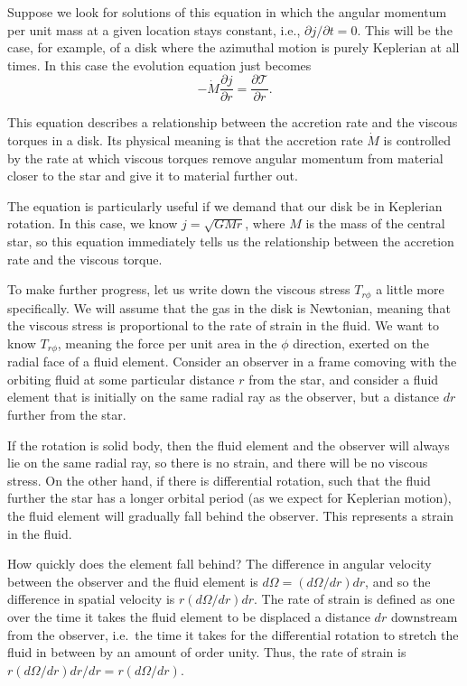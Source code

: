 Suppose we look for solutions of this equation in which the angular momentum per unit mass at a given location stays constant, i.e., $\partial j/\partial t=0$. This will be the case, for example, of a disk where the azimuthal motion is purely Keplerian at all times. In this case the evolution equation just becomes
\begin{equation}
-\dot{M} \frac{\partial j}{\partial r} = \frac{\partial \mathcal{T}}{\partial r}.
\end{equation}

This equation describes a relationship between the accretion rate and the viscous torques in a disk. Its physical meaning is that the accretion rate $\dot{M}$ is controlled by the rate at which viscous torques remove angular momentum from material closer to the star and give it to material further out.

The equation is particularly useful if we demand that our disk be in Keplerian rotation. In this case, we know $j=\sqrt{G M r}$, where $M$ is the mass of the central star, so this equation immediately tells us the relationship between the accretion rate and the viscous torque.

To make further progress, let us write down the viscous stress $T_{r\phi}$ a little more specifically. We will assume that the gas in the disk is Newtonian, meaning that the viscous stress is proportional to the rate of strain in the fluid. We want to know $T_{r\phi}$, meaning the force per unit area in the $\phi$ direction, exerted on the radial face of a fluid element. Consider an observer in a frame comoving with the orbiting fluid at some particular distance $r$ from the star, and consider a fluid element that is initially on the same radial ray as the observer, but a distance $dr$ further from the star.

If the rotation is solid body, then the fluid element and the observer will always lie on the same radial ray, so there is no strain, and there will be no viscous stress. On the other hand, if there is differential rotation, such that the fluid further the star has a longer orbital period (as we expect for Keplerian motion), the fluid element will gradually fall behind the observer. This represents a strain in the fluid.

How quickly does the element fall behind? The difference in angular velocity between the observer and the fluid element is $d\Omega = (d\Omega/dr) dr$, and so the difference in spatial velocity is $r (d\Omega/dr) dr$. The rate of strain is defined as one over the time it takes the fluid element to be displaced a distance $dr$ downstream from the observer, i.e.\ the time it takes for the differential rotation to stretch the fluid in between by an amount of order unity. Thus, the rate of strain is $r (d\Omega/dr) dr/dr = r (d\Omega/dr)$.


